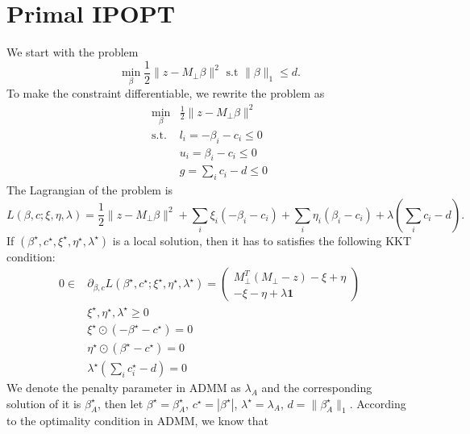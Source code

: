 \documentclass{article}
\begin{document}
\section{Primal IPOPT}
We start with the problem
\begin{equation}
    \min_{\beta} \frac{1}{2}\|z-M_{\perp}\beta\|^2 \text{ s.t }\|\beta\|_1\leq d.
\end{equation}
To make the constraint differentiable, we rewrite the problem as
\begin{equation}
    \begin{aligned}
        \min_{\beta} &\frac{1}{2}\|z-M_{\perp}\beta\|^2\\
        \text{s.t. }&l_i = -\beta_i-c_i\leq 0\\
        &u_i = \beta_i-c_i\leq 0\\
        &g = \sum_{i}c_i-d\leq 0
    \end{aligned}
\end{equation}
The Lagrangian of the problem is
\begin{equation}
    L(\beta,c; \xi,\eta,\lambda)= 
     \frac{1}{2}\|z-M_{\perp}\beta\|^2
     +\sum_{i}\xi_i(-\beta_i-c_i)
     +\sum_{i}\eta_i(\beta_i-c_i)
     + \lambda(\sum_{i}c_i-d).
\end{equation}
If $(\beta^\star, c^\star, \xi^\star, \eta^\star, \lambda^\star)$ is a local solution, then it has to satisfies the following KKT condition:
\begin{equation}
    \begin{aligned}
        0\in &\partial_{\beta, c}L(\beta^\star, c^\star; \xi^\star, \eta^\star, \lambda^\star) = \begin{pmatrix}
            M_{\perp}^T(M_{\perp}-z)-\xi+\eta\\
            -\xi-\eta+\lambda\boldsymbol{1}
        \end{pmatrix}\\
        &\xi^\star, \eta^\star, \lambda^\star \geq 0\\
        &\xi^\star\odot (-\beta^\star-c^\star)=0\\ &\eta^\star\odot(\beta^\star-c^\star)=0\\ &\lambda^\star(\sum_{i}c_i^\star-d)=0      
    \end{aligned}
\end{equation}
We denote the penalty parameter in ADMM as $\lambda_A$ and the corresponding solution of it is $\beta^\star_A$, then let $\beta^\star = \beta^\star_A$, $c^\star = |\beta^\star|$, $\lambda^\star = \lambda_A$, $d = \|\beta_A^\star\|_1$. According to the optimality condition in ADMM, we know that
\end{document}
